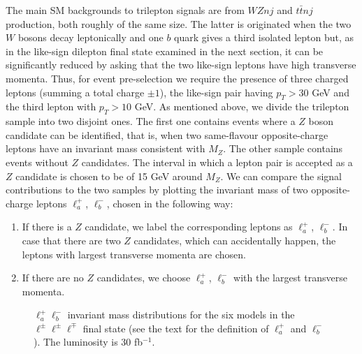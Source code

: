\documentclass[12pt,a4paper]{article}
\begin{document}
The main SM backgrounds to trilepton signals are from $WZnj$ and $t \bar t nj$ production, both roughly of the same size. The latter is originated when the two $W$ bosons decay leptonically and one $b$ quark gives a third isolated lepton but, as in the like-sign dilepton final state examined in the next section, it can be significantly reduced by asking that the two like-sign leptons have high transverse momenta. Thus, for event pre-selection we require the presence of three charged leptons (summing a total charge $\pm 1$), the like-sign pair having $p_T > 30$ GeV and the third lepton with $p_T > 10$ GeV. As mentioned above, we divide the trilepton sample into two disjoint ones. The first one contains events where a $Z$ boson candidate can be identified, that is, when two same-flavour opposite-charge leptons have an invariant mass consistent with $M_Z$. The other sample contains events without $Z$ candidates. The interval  in which a lepton pair is accepted as a $Z$ candidate is chosen to be of 15 GeV around $M_Z$. We can compare the signal contributions to the two samples by plotting the invariant mass of two opposite-charge leptons $\ell_a^+$, $\ell_b^-$, chosen in the following way:
\begin{enumerate}
\item If there is a $Z$ candidate, we label the corresponding leptons as $\ell_a^+$, $\ell_b^-$. In case that there are two $Z$ candidates, which can accidentally happen, the leptons with largest transverse momenta are chosen. 
\item If there are no $Z$ candidates, we choose $\ell_a^+$, $\ell_b^-$ with the largest transverse momenta.
\end{enumerate}
%
\begin{figure}[htb]
\begin{center}
\caption{$\ell_a^+ \ell_b^-$ invariant mass distributions for the six models in the $\ell^\pm \ell^\pm \ell^\mp$ final state (see the text for the definition of $\ell_a^+$ and $\ell_b^-$).
The luminosity is 30 fb$^{-1}$.}
\label{fig:mZrec-3Q1}
\end{center}
\end{figure}
%
\end{document}
